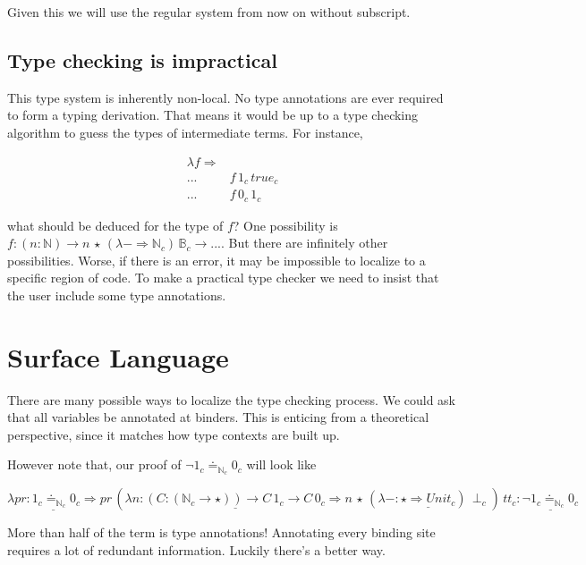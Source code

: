 Given this we will use the regular system from now on without subscript.



\subsection{Type checking is impractical}

This type system is inherently non-local.
No type annotations are ever required to form a typing derivation.
That means it would be up to a type checking algorithm to guess the types of intermediate terms.
For instance, 

\begin{align*}
\lambda f\Rightarrow & \,\\
... & f\,1_{c}\,true_{c}\\
... & f\,0_{c}\,1_{c}
\end{align*}
  
what should be deduced for the type of $f$? One possibility is $f:\left(n:\mathbb{N}\right)\rightarrow n\,\star\,\left(\lambda-\Rightarrow\mathbb{N}_{c}\right)\,\mathbb{B}_{c}\rightarrow...$.
But there are infinitely other possibilities.
Worse, if there is an error, it may be impossible to localize to a specific region of code.
To make a practical type checker we need to insist that the user include some type annotations.

\section{\Bidir{} Surface Language}

There are many possible ways to localize the type checking process.
We could ask that all variables be annotated at binders.
This is enticing from a theoretical perspective, since it matches how type contexts are built up.

However note that, our proof of $\lnot1_{c}\doteq_{\mathbb{N}_{c}}0_{c}$ will look like

$\lambda pr\underline{:1_{c}\doteq_{\mathbb{N}_{c}}0_{c}}\Rightarrow pr\,\left(\lambda n:\underline{\left(C:\left(\mathbb{N}_{c}\rightarrow\star\right)\right)\rightarrow C\,1_{c}\rightarrow C\,0_{c}}\Rightarrow n\,\star\,(\lambda-:\underline{\star\Rightarrow Unit_{c}})\,\perp_{c}\right)\,tt_{c}:\underline{\lnot1_{c}\doteq_{\mathbb{N}_{c}}0_{c}}$

More than half of the term is type annotations!
Annotating every binding site requires a lot of redundant information.
Luckily there's a better way.
